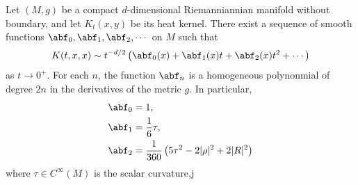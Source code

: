 \begin{proposition}\label{prop:asymptoticExpansion}
    Let $(M,g)$ be a compact $d$-dimensional Riemanniannian manifold without boundary, and let $K_t(x,y)$ be its heat kernel.  There exist a sequence of smooth functions $\abf_0,\abf_1, \abf_2,\cdots$ on $M$ such that
    \begin{align}\label{eq:asymptoticExpansion}
        K(t,x,x) \sim t^{-d/2}\left(\abf_0(x)+ \abf_1(x) t + \abf_2(x) t^2 +\cdots  \right)
    \end{align}
    as $t \to 0^+$. For each $n$, the function $\abf_n$ is a homogeneous polynonmial of degree $2n$ in the derivatives of the metric $g$.
    In particular,
    \begin{align}
        \abf_0 & = 1,                                                       \\
        \abf_1 & =\frac{1}{6} \tau,                                         \\
        \abf_2 & =\frac{1}{360}\left( 5\tau^2 - 2 |\rho|^2 +2 |R|^2 \right)
    \end{align}
    where $\tau \in C^\infty(M)$ is the scalar curvature,j
\end{proposition}













\newpage








